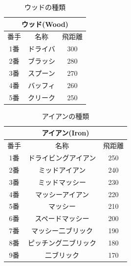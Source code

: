 \documentclass[a4j, twocolumn]{jarticle}
\begin{document}
\begin{table}[htb]
    \caption{ウッドの種類}
    \label{Wood_Table}
    \begin{center}
        \begin{tabular}{|c|c|c|}
            \hline
            \multicolumn{3}{|c|}{ウッド(Wood)}\\ %
            \hline
            番手&名称&飛距離\\
            \hline
            1番&ドライバ&300\\ 
            \hline
            2番&ブラッシ&280\\
            \hline
            3番&スプーン&270\\
            \hline
            4番&バッフィ&260\\
            \hline
            5番&クリーク&250\\
            \hline
        \end{tabular}
    \end{center}
\end{table}

\begin{table}[htb]
    \caption{アイアンの種類}
    \label{Iron_Table}
    \begin{center}
        \begin{tabular}{|c|c|c|}
            \hline
            \multicolumn{3}{|c|}{アイアン(Iron)}\\
            \hline
            番手&名称&飛距離\\ 
            \hline
            1番&ドライビングアイアン&250\\
            \hline
            2番&ミッドアイアン&240\\
            \hline
            3番&ミッドマッシー&230\\ 
            \hline
            4番&マッシーアイアン&220\\
            \hline
            5番&マッシー&210\\
            \hline
            6番&スペードマッシー&200\\
            \hline
            7番&マッシー二ブリック&190\\
            \hline
            8番&ピッチング二ブリック&180\\
            \hline
            9番&二ブリック&170\\
            \hline
        \end{tabular}
    \end{center}
\end{table}
\end{document}
